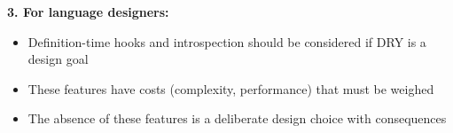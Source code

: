 \textbf{3. For language designers:}
\begin{itemize}
\tightlist
\item Definition-time hooks and introspection should be considered if DRY is a design goal
\item These features have costs (complexity, performance) that must be weighed
\item The absence of these features is a deliberate design choice with consequences
\end{itemize}

